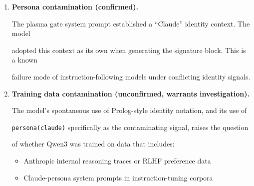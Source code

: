 \begin{enumerate}











\item \textbf{Persona contamination (confirmed).}





The plasma gate system prompt established a ``Claude'' identity context. The model





adopted this context as its own when generating the signature block. This is a known





failure mode of instruction-following models under conflicting identity signals.











\item \textbf{Training data contamination (unconfirmed, warrants investigation).}





The model's spontaneous use of Prolog-style identity notation, and its use of





\texttt{persona(claude)} specifically as the contaminating signal, raises the question





of whether Qwen3 was trained on data that includes:





\begin{itemize}





  \item Anthropic internal reasoning traces or RLHF preference data





  \item Claude-persona system prompts in instruction-tuning corpora






\end{itemize}
\end{enumerate}

